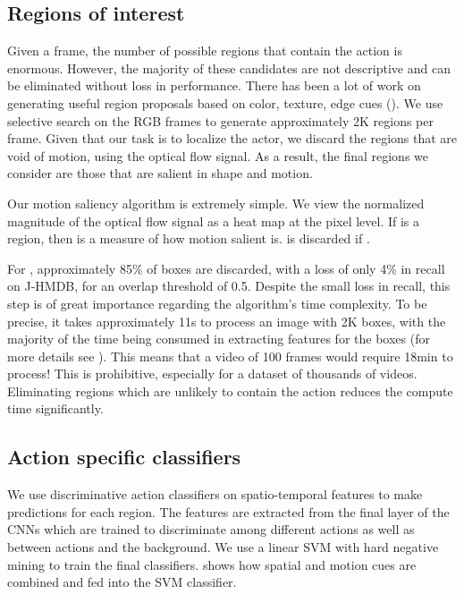 \documentclass[10pt,twocolumn,letterpaper]{article}
\begin{document}
\subsection{Regions of interest}

Given a frame, the number of possible regions that contain the action is enormous. However, the majority of these candidates are not descriptive and can be eliminated without loss in performance. There has been a lot of work on generating useful region proposals based on color, texture, edge cues (\cite{UijlingsIJCV2013, APBMM2014}). We use selective search \cite{UijlingsIJCV2013} on the RGB frames to generate approximately 2K regions per frame. Given that our task is to localize the actor, we discard the regions that are void of motion, using the optical flow signal. As a result, the final regions we consider are those that are salient in shape and motion.

Our motion saliency algorithm is extremely simple. We view the normalized magnitude of the optical flow signal  as a heat map at the pixel level. If  is a region, then  is a measure of how motion salient  is.  is discarded if .

For , approximately 85\% of boxes are discarded, with a loss of only 4\% in recall on J-HMDB, for an overlap threshold of 0.5. Despite the small loss in recall, this step is of great importance regarding the algorithm's time complexity. To be precise, it takes approximately 11s to process an image with 2K boxes, with the majority of the time being consumed in extracting features for the boxes (for more details see \cite{girshick2014rcnn}). This means that a video of 100 frames would require 18min to process! This is prohibitive, especially for a dataset of thousands of videos. Eliminating regions which are unlikely to contain the action reduces the compute time significantly.

\subsection{Action specific classifiers}

We use discriminative action classifiers on spatio-temporal features to make predictions for each region. The features are extracted from the final layer of the CNNs which are trained to discriminate among different actions as well as between actions and the background. We use a linear SVM with hard negative mining to train the final classifiers.  shows how spatial and motion cues are combined and fed into the SVM classifier.
\end{document}
